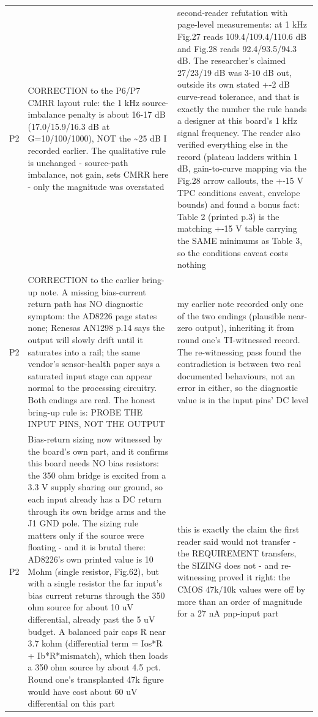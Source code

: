 \documentclass[11pt,a4paper]{article}
\begin{document}
{\begin{longtable}{lp{5.2cm}p{7.2cm}}
P2 & CORRECTION to the P6/P7 CMRR layout rule: the 1 kHz source-imbalance penalty is about 16-17 dB (17.0/15.9/16.3 dB at G=10/100/1000), NOT the \textasciitilde{}25 dB I recorded earlier. The qualitative rule is unchanged - source-path imbalance, not gain, sets CMRR here - only the magnitude was overstated & second-reader refutation with page-level measurements: at 1 kHz Fig.27 reads 109.4/109.4/110.6 dB and Fig.28 reads 92.4/93.5/94.3 dB. The researcher's claimed 27/23/19 dB was 3-10 dB out, outside its own stated +-2 dB curve-read tolerance, and that is exactly the number the rule hands a designer at this board's 1 kHz signal frequency. The reader also verified everything else in the record (plateau ladders within 1 dB, gain-to-curve mapping via the Fig.28 arrow callouts, the +-15 V TPC conditions caveat, envelope bounds) and found a bonus fact: Table 2 (printed p.3) is the matching +-15 V table carrying the SAME minimums as Table 3, so the conditions caveat costs nothing \\
P2 & CORRECTION to the earlier bring-up note. A missing bias-current return path has NO diagnostic symptom: the AD8226 page states none; Renesas AN1298 p.14 says the output will slowly drift until it saturates into a rail; the same vendor's sensor-health paper says a saturated input stage can appear normal to the processing circuitry. Both endings are real. The honest bring-up rule is: PROBE THE INPUT PINS, NOT THE OUTPUT & my earlier note recorded only one of the two endings (plausible near-zero output), inheriting it from round one's TI-witnessed record. The re-witnessing pass found the contradiction is between two real documented behaviours, not an error in either, so the diagnostic value is in the input pins' DC level \\
P2 & Bias-return sizing now witnessed by the board's own part, and it confirms this board needs NO bias resistors: the 350 ohm bridge is excited from a 3.3 V supply sharing our ground, so each input already has a DC return through its own bridge arms and the J1 GND pole. The sizing rule matters only if the source were floating - and it is brutal there: AD8226's own printed value is 10 Mohm (single resistor, Fig.62), but with a single resistor the far input's bias current returns through the 350 ohm source for about 10 uV differential, already past the 5 uV budget. A balanced pair caps R near 3.7 kohm (differential term = Ios{*}R + Ib{*}R{*}mismatch), which then loads a 350 ohm source by about 4.5 pct. Round one's transplanted 47k figure would have cost about 60 uV differential on this part & this is exactly the claim the first reader said would not transfer - the REQUIREMENT transfers, the SIZING does not - and re-witnessing proved it right: the CMOS 47k/10k values were off by more than an order of magnitude for a 27 nA pnp-input part \\

\end{longtable}}
\end{document}
